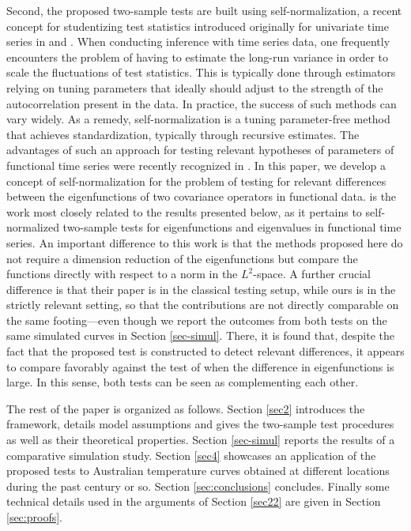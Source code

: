 \documentclass[11pt]{article}
\numberwithin{equation}{section}
\numberwithin{theorem}{section}
\numberwithin{lemma}{section}
\numberwithin{proposition}{section}
\numberwithin{cor}{section}
\numberwithin{definition}{section}
\numberwithin{cons}{section}
\numberwithin{rem}{section}
\numberwithin{exa}{section}
\numberwithin{table}{section}
\numberwithin{figure}{section}
\numberwithin{algo}{section}
\begin{document}
{{Second, the proposed two-sample tests are built using self-normalization, a recent concept for studentizing test statistics introduced originally for univariate time series in \citet{shao2010} and \citet{shazha2010}. When conducting inference with time series data, one frequently encounters the problem of having to estimate the long-run variance in order to scale the fluctuations of test statistics. This is typically done through estimators relying on tuning parameters that ideally should adjust to the strength of the autocorrelation present in the data. In practice, the success of such methods can vary widely.
As a remedy, self-normalization is a tuning parameter-free method that achieves standardization, typically through recursive estimates. The advantages of such an approach for testing relevant  hypotheses of parameters of   functional time series were recently recognized in
 \citet{detkokvol2018}. In this paper, we develop  a concept of self-normalization for   the problem of testing for relevant  differences between the eigenfunctions of two covariance operators
 in functional data.  \citet{zhangshao2015} is the work most closely related to the results presented below, as it pertains to self-normalized two-sample tests for eigenfunctions and eigenvalues in  functional time series.
An  important difference to this work is that the methods proposed here  do not require a  dimension reduction  of the eigenfunctions but compare the functions directly  with respect to a norm
in the $L^{2}$-space. A  further  crucial difference
is that their paper is in the classical testing setup, while ours is in the strictly relevant setting, so that the contributions are not directly comparable on the same footing---even though we report the outcomes from both tests on the same simulated curves in Section \ref{sec-simul}. There, it is found that, despite the fact that the proposed test is constructed to detect relevant differences, it appears to compare favorably against the test of \citet{zhangshao2015} when the difference in eigenfunctions is large. In this sense, both tests can be seen as complementing each other.

The rest of the paper is organized as follows. Section \ref{sec2} introduces the framework, details model assumptions and gives the two-sample test procedures as well as their theoretical properties. Section \ref{sec-simul} reports the results of a comparative simulation study. Section \ref{sec4} showcases an application of the proposed tests to Australian temperature curves obtained at different locations during the past century or so. Section \ref{sec:conclusions} concludes.
Finally some technical  details used  in the arguments of Section \ref{sec22}  are given in Section \ref{sec:proofs}.

}}
\end{document}
